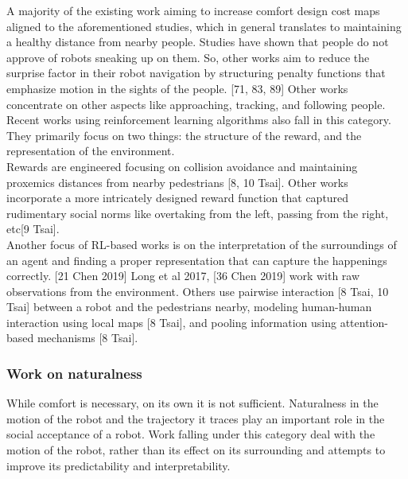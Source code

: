 A majority of the existing work aiming to increase comfort design cost maps aligned to the aforementioned studies, which in general translates to maintaining a healthy distance from nearby people. Studies have shown that people do not approve of robots sneaking up on them. So, other works aim to reduce the surprise factor in their robot navigation by structuring penalty functions that emphasize motion in the sights of the people. [71, 83, 89]
Other works concentrate on other aspects like approaching, tracking, and following people.\\

Recent works using reinforcement learning algorithms also fall in this category. They primarily focus on two things: the structure of the reward, and the representation of the environment. \\

Rewards are engineered focusing on collision avoidance and maintaining proxemics distances from nearby pedestrians [8, 10 Tsai]. Other works incorporate a more intricately designed reward function that captured rudimentary social norms like overtaking from the left, passing from the right, etc[9 Tsai]. \\

Another focus of RL-based works is on the interpretation of the surroundings of an agent and finding a proper representation that can capture the happenings correctly. [21 Chen 2019] Long et al 2017, [36 Chen 2019] work with raw observations from the environment. Others use pairwise interaction [8 Tsai, 10 Tsai] between a robot and the pedestrians nearby, modeling human-human interaction using local maps [8 Tsai], and pooling information using attention-based mechanisms [8 Tsai].

\subsubsection{Work on naturalness}
While comfort is necessary, on its own it is not sufficient. Naturalness in the motion of the robot and the trajectory it traces play an important role in the social acceptance of a robot. Work falling under this category deal with the motion of the robot, rather than its effect on its surrounding and attempts to improve its predictability and interpretability.\\ %

